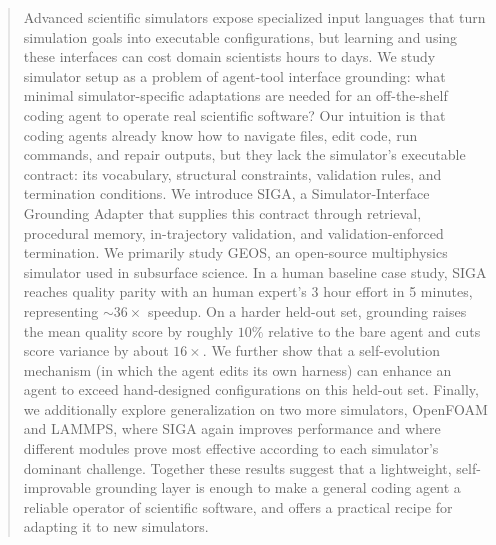 \documentclass{article}
\begin{document}
\begin{abstract}
Advanced scientific simulators expose specialized input languages that turn simulation goals into executable configurations, but learning and using these interfaces can cost domain scientists hours to days. We study simulator setup as a problem of agent-tool interface grounding: what minimal simulator-specific adaptations are needed for an off-the-shelf coding agent to operate real scientific software? Our intuition is that coding agents already know how to navigate files, edit code, run commands, and repair outputs, but they lack the simulator's executable contract: its vocabulary, structural constraints, validation rules, and termination conditions. We introduce SIGA, a Simulator-Interface Grounding Adapter that supplies this contract through retrieval, procedural memory, in-trajectory validation, and validation-enforced termination. We primarily study GEOS, an open-source multiphysics simulator used in subsurface science. In a human baseline case study, SIGA reaches quality parity with an human expert's 3 hour effort in 5 minutes, representing $\sim 36\times$ speedup. On a harder held-out set, grounding raises the mean quality score by roughly $10\%$ relative to the bare agent and cuts score variance by about $16\times$. 
We further show that a self-evolution mechanism (in which the agent edits its own harness) can enhance an agent to exceed hand-designed configurations on this held-out set. 
Finally, we additionally explore generalization on two more simulators, OpenFOAM and LAMMPS, where SIGA again improves performance and where different modules prove most effective according to each simulator's dominant challenge. Together these results suggest that a lightweight, self-improvable grounding layer is enough to make a general coding agent a reliable operator of scientific software, and offers a practical recipe for adapting it to new simulators.

\end{abstract}
\end{document}
